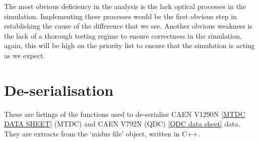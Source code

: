 \documentclass[]{article}
\begin{document}
The most obvious deficiency in the analysis is the lack optical processes in the simulation. Implementing these processes would be the first obvious step in establishing the cause of the difference that we see. Another obvious weakness is the lack of a thorough testing regime to ensure correctness in the simulation, again, this will be high on the priority list to ensure that the simulation is acting as we expect. 

\pagebreak
\appendix
\section{De-serialisation} %
\label{app:deserialisation}
%
These are listings of the functions used to de-serialise CAEN V1290N \ref{MTDC DATA SHEET} (MTDC) and CAEN V792N (QDC) \ref{QDC data sheet} data. They are extracts from the `midus file' object, written in C++.
%
\end{document}
